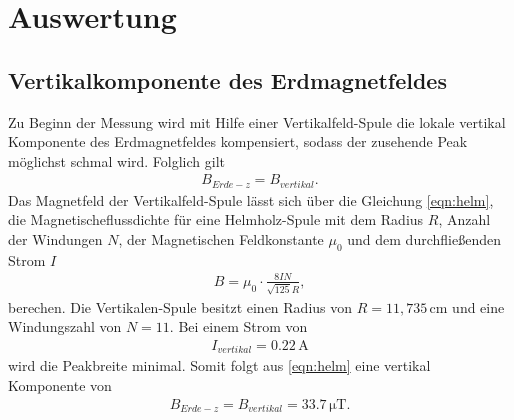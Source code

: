 \section{Auswertung}
\label{sec:Auswertung}
\subsection{Vertikalkomponente des Erdmagnetfeldes}
Zu Beginn der Messung wird mit Hilfe einer Vertikalfeld-Spule
die lokale vertikal Komponente des Erdmagnetfeldes kompensiert, sodass
der zusehende Peak
möglichst schmal wird. Folglich
gilt
\begin{align*}
B_{Erde-z}=B_{vertikal}.
\end{align*}
Das Magnetfeld der Vertikalfeld-Spule lässt sich über die Gleichung
\eqref{eqn:helm}, die Magnetischeflussdichte für eine Helmholz-Spule mit dem Radius $R$,
Anzahl der Windungen $N$, der Magnetischen Feldkonstante $\mu_0$ und dem durchfließenden Strom $I$
\begin{align}
B=\mu_0 \cdot \frac{8 I N}{\sqrt{125} R}, \label{eqn:helm}
\end{align}
berechen. Die Vertikalen-Spule besitzt einen Radius von $R=11,735\,\si{\centi\meter} $
und eine Windungszahl von $N=11$.
Bei einem Strom von
\begin{align*}
  I_{vertikal}=0.22 \,\si{\ampere}
\end{align*}
wird die Peakbreite minimal. Somit folgt aus \eqref{eqn:helm}
eine  vertikal Komponente von
\begin{align*}
  B_{Erde-z}=B_{vertikal}=33.7\,\si{\micro\tesla}.
\end{align*}


\newpage
